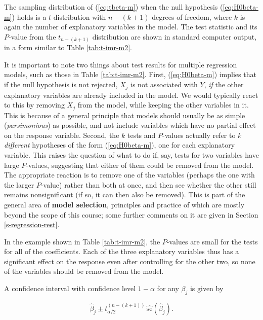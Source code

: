 \documentclass[11pt,a4paper,openany]{book}
\begin{document}
The sampling distribution of (\ref{eq:tbeta-m}) when the null hypothesis
(\ref{eq:H0beta-m}) holds is a \(t\) distribution with \(n-(k+1)\)
degrees of freedom, where \(k\) is again the number of explanatory
variables in the model. The test statistic and its \(P\)-value from the
\(t_{n-(k+1)}\) distribution are shown in standard computer output, in a
form similar to Table \ref{tab:t-imr-m2}.

It is important to note two things about test results for multiple
regression models, such as those in Table \ref{tab:t-imr-m2}. First,
(\ref{eq:H0beta-m}) implies that if the null hypothesis is not rejected,
\(X_{j}\) is not associated with \(Y\), \emph{if} the other explanatory
variables are already included in the model. We would typically react to
this by removing \(X_{j}\) from the model, while keeping the other
variables in it. This is because of a general principle that models
should usually be as simple (\emph{parsimonious}) as possible, and not
include variables which have no partial effect on the response variable.
Second, the \(k\) tests and \(P\)-values actually refer to \(k\)
\emph{different} hypotheses of the form (\ref{eq:H0beta-m}), one for
each explanatory variable. This raises the question of what to do if,
say, tests for two variables have large \(P\)-values, suggesting that
either of them could be removed from the model. The appropriate reaction
is to remove one of the variables (perhaps the one with the larger
\(P\)-value) rather than both at once, and then see whether the other
still remains nonsignificant (if so, it can then also be removed). This
is part of the general area of \textbf{model selection}, principles and
practice of which are mostly beyond the scope of this course; some
further comments on it are given in Section \ref{s-regression-rest}.

In the example shown in Table \ref{tab:t-imr-m2}, the \(P\)-values are
small for the tests for all of the coefficients. Each of the three
explanatory variables thus has a significant effect on the response even
after controlling for the other two, so none of the variables should be
removed from the model.

A confidence interval with confidence level \(1-\alpha\) for any
\(\beta_{j}\) is given by

\begin{equation}\hat{\beta}_{j} \pm t_{\alpha/2}^{(n-(k+1))} \,
\hat{\text{se}}(\hat{\beta}_{j}).
\label{eq:cibeta-m}\end{equation}
\end{document}
